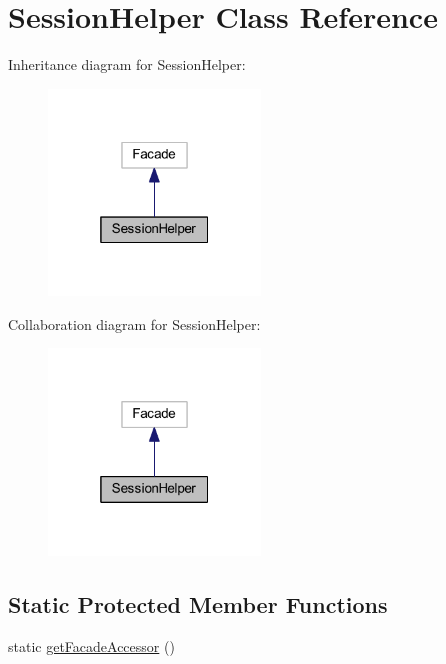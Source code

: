 \hypertarget{classhamburgscleanest_1_1_data_tables_1_1_facades_1_1_session_helper}{}\section{Session\+Helper Class Reference}
\label{classhamburgscleanest_1_1_data_tables_1_1_facades_1_1_session_helper}


Inheritance diagram for Session\+Helper\+:\nopagebreak
\begin{figure}[H]
\begin{center}
\leavevmode
\includegraphics[width=160pt]{classhamburgscleanest_1_1_data_tables_1_1_facades_1_1_session_helper__inherit__graph}
\end{center}
\end{figure}


Collaboration diagram for Session\+Helper\+:\nopagebreak
\begin{figure}[H]
\begin{center}
\leavevmode
\includegraphics[width=160pt]{classhamburgscleanest_1_1_data_tables_1_1_facades_1_1_session_helper__coll__graph}
\end{center}
\end{figure}
\subsection*{Static Protected Member Functions}
\begin{DoxyCompactItemize}
\item 
static \hyperlink{classhamburgscleanest_1_1_data_tables_1_1_facades_1_1_session_helper_a19a808201f41f32f71a0532cb49b450f}{get\+Facade\+Accessor} ()
\end{DoxyCompactItemize}


